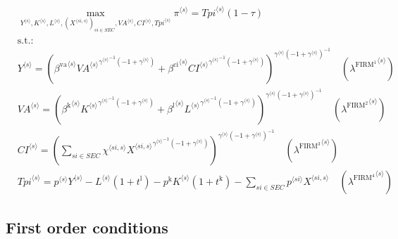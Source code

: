 \begin{align}
&\max_{{Y}^{\langle s\rangle}, {K}^{\langle s\rangle}, {L}^{\langle s\rangle}, \left({X}^{\langle {s\!i},s\rangle}\right)_{{s\!i}\in {S\!E\!C}}, {{V\!A}}^{\langle s\rangle}, {{C\!I}}^{\langle s\rangle}, {{T\!p\!i}}^{\langle s\rangle}
} {\pi}^{\langle s\rangle} = {{{T\!p\!i}}^{\langle s\rangle}} \left(1 - \tau\right)\\
&\mathrm{s.t.:}\nonumber\\
& {Y}^{\langle s\rangle} = \left({{\beta^{\mathrm{va}}}^{\langle s\rangle}} {{{{V\!A}}^{\langle s\rangle}}^{{{\gamma}^{\langle s\rangle}}^{-1} \left(-1 + {\gamma}^{\langle s\rangle}\right)}} + {{\beta^{\mathrm{ci}}}^{\langle s\rangle}} {{{{C\!I}}^{\langle s\rangle}}^{{{\gamma}^{\langle s\rangle}}^{-1} \left(-1 + {\gamma}^{\langle s\rangle}\right)}}\right)^{{{\gamma}^{\langle s\rangle}} \left(-1 + {\gamma}^{\langle s\rangle}\right)^{-1}} \quad \left({\lambda^{\mathrm{FIRM}^{\mathrm{1}}}}^{\langle s\rangle}\right)\\
& {{V\!A}}^{\langle s\rangle} = \left({{\beta^{\mathrm{k}}}^{\langle s\rangle}} {{{K}^{\langle s\rangle}}^{{{\gamma}^{\langle s\rangle}}^{-1} \left(-1 + {\gamma}^{\langle s\rangle}\right)}} + {{\beta^{\mathrm{l}}}^{\langle s\rangle}} {{{L}^{\langle s\rangle}}^{{{\gamma}^{\langle s\rangle}}^{-1} \left(-1 + {\gamma}^{\langle s\rangle}\right)}}\right)^{{{\gamma}^{\langle s\rangle}} \left(-1 + {\gamma}^{\langle s\rangle}\right)^{-1}} \quad \left({\lambda^{\mathrm{FIRM}^{\mathrm{2}}}}^{\langle s\rangle}\right)\\
& {{C\!I}}^{\langle s\rangle} = \left(\sum_{{s\!i}\in {S\!E\!C}} {{\chi}^{\langle {s\!i},s\rangle}} {{{X}^{\langle {s\!i},s\rangle}}^{{{\gamma}^{\langle s\rangle}}^{-1} \left(-1 + {\gamma}^{\langle s\rangle}\right)}}\right)^{{{\gamma}^{\langle s\rangle}} \left(-1 + {\gamma}^{\langle s\rangle}\right)^{-1}} \quad \left({\lambda^{\mathrm{FIRM}^{\mathrm{3}}}}^{\langle s\rangle}\right)\\
& {{T\!p\!i}}^{\langle s\rangle} = {{p}^{\langle s\rangle}} {{Y}^{\langle s\rangle}} - {{L}^{\langle s\rangle}} \left(1 + t^{\mathrm{l}}\right) - {p^{\mathrm{k}}} {{K}^{\langle s\rangle}} \left(1 + t^{\mathrm{k}}\right) - \sum_{{s\!i}\in {S\!E\!C}} {{p}^{\langle {s\!i}\rangle}} {{X}^{\langle {s\!i},s\rangle}} \quad \left({\lambda^{\mathrm{FIRM}^{\mathrm{4}}}}^{\langle s\rangle}\right)
\end{align}


\subsection{First order conditions}

